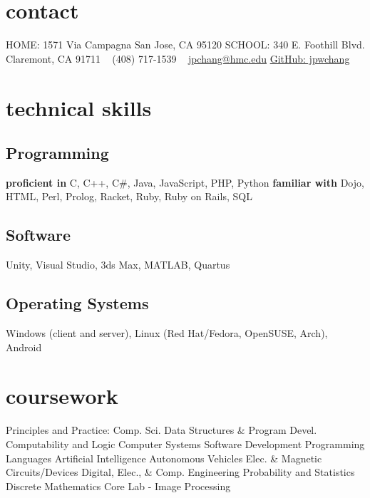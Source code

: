 \documentclass[print]{friggeri-cv} %
\begin{document}


\begin{aside} %
\section{contact}
HOME:
1571 Via Campagna
San Jose, CA 95120
SCHOOL:
340 E. Foothill Blvd.
Claremont, CA 91711
~
(408) 717-1539
~
\href{mailto:jpchang@hmc.edu}{jpchang@hmc.edu}
\href{https://github.com/jpwchang}{GitHub: jpwchang}
\section{technical skills} 
\subsection{Programming}
\textbf{proficient in}
C, C++, C\#, Java, JavaScript, PHP, Python
\textbf{familiar with}
Dojo, HTML, Perl, Prolog, Racket, Ruby, Ruby on Rails, SQL
\subsection{Software}
Unity, Visual Studio, 3ds Max, MATLAB, Quartus
\subsection{Operating Systems}
Windows (client and server), Linux (Red Hat/Fedora, OpenSUSE, Arch), Android
\section{coursework}
Principles and Practice: Comp. Sci.
Data Structures \& Program Devel.
Computability and Logic
Computer Systems
Software Development
Programming Languages
Artificial Intelligence
Autonomous Vehicles
Elec. \& Magnetic Circuits/Devices
Digital, Elec., \& Comp. Engineering
Probability and Statistics
Discrete Mathematics
Core Lab - Image Processing
\end{aside}

\end{document}

